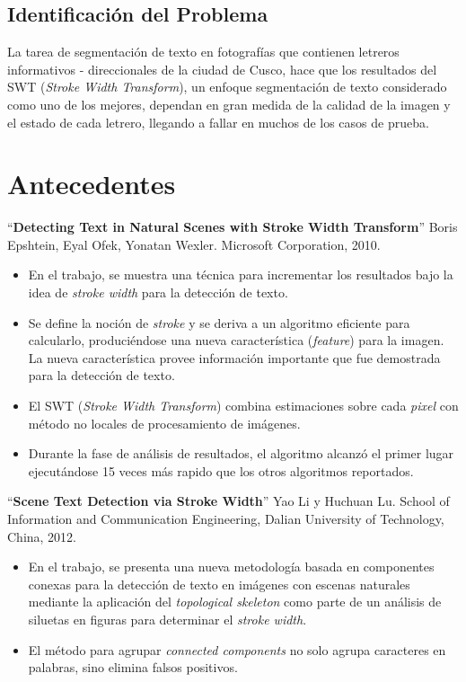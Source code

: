 \subsection{Identificación del Problema}
La tarea de segmentación de texto en fotografías que contienen letreros
informativos - direccionales de la ciudad de Cusco, hace que los resultados del
SWT (\textit{Stroke Width Transform}), un enfoque segmentación de texto
considerado como uno de los mejores, dependan en gran medida de la calidad de la
imagen y el estado de cada letrero, llegando a fallar en muchos de los casos de
prueba.

\section{Antecedentes}
``\textbf{Detecting Text in Natural Scenes with Stroke Width Transform}'' Boris
Epshtein, Eyal Ofek, Yonatan Wexler. Microsoft Corporation,
2010.\cite{Epshtein:SWT:2010}
\begin{itemize}
	\item En el trabajo, se muestra una técnica para incrementar los resultados
bajo la idea de \textit{stroke width} para la detección de texto.
	\item Se define la noción de \textit{stroke} y se deriva a un algoritmo
eficiente para calcularlo, produciéndose una nueva característica
(\textit{feature}) para la imagen. La nueva característica provee información
importante que fue demostrada para la detección de texto.
	\item El SWT (\textit{Stroke Width Transform}) combina estimaciones sobre cada
\textit{pixel} con método no locales de procesamiento de imágenes.
	\item Durante la fase de análisis de resultados, el algoritmo alcanzó el
primer lugar ejecutándose 15 veces más rapido que los otros algoritmos
reportados.
\end{itemize}

``\textbf{Scene Text Detection via Stroke Width}'' Yao Li y Huchuan Lu. School
of Information and Communication Engineering, Dalian University of Technology,
China, 2012. \cite{li:2012:scene}
\begin{itemize}
	\item En el trabajo, se presenta una nueva metodología basada en componentes
conexas para la detección de texto en imágenes con escenas naturales mediante la
aplicación del \textit{topological skeleton} como parte de un análisis de
siluetas en figuras para determinar el \textit{stroke width}.
	\item El método para agrupar \textit{connected components} no solo agrupa
caracteres en palabras, sino elimina falsos positivos.
\end{itemize}

